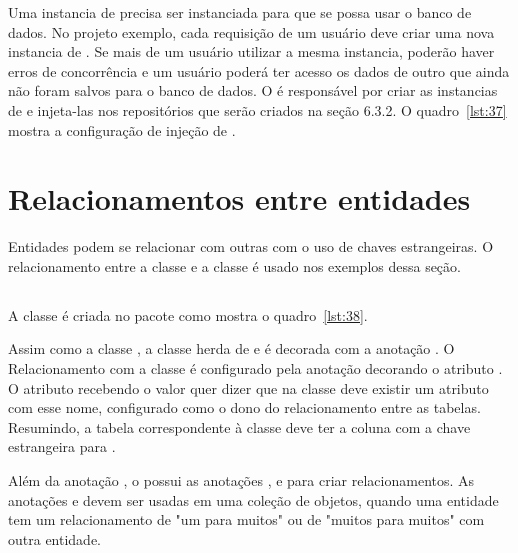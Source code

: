 Uma instancia de  precisa ser instanciada para que se possa usar o banco de dados. No projeto exemplo, cada requisição de um usuário deve criar uma nova instancia de . Se mais de um usuário utilizar a mesma instancia, poderão haver erros de concorrência e um usuário poderá ter acesso os dados de outro que ainda não foram salvos para o banco de dados. O  é responsável por criar as instancias de  e injeta-las nos repositórios que serão criados na seção 6.3.2. O quadro~\ref{lst:37} mostra a configuração de injeção de .


\section{Relacionamentos entre entidades}

Entidades podem se relacionar com outras com o uso de chaves estrangeiras. O relacionamento entre a classe  e a classe  é usado nos exemplos dessa seção.

\subsection{}

A classe  é criada no pacote  como mostra o quadro~\ref{lst:38}.


Assim como a classe , a classe  herda de  e é decorada com a anotação . O Relacionamento com a classe  é configurado pela anotação  decorando o atributo . O atributo  recebendo o valor  quer dizer que na classe  deve existir um atributo com esse nome, configurado como o dono do relacionamento entre as tabelas. Resumindo, a tabela correspondente à classe  deve ter a coluna com a chave estrangeira para .

Além da anotação , o  possui as anotações ,  e  para criar relacionamentos. As anotações  e  devem ser usadas em uma coleção de objetos, quando uma entidade tem um relacionamento de "um para muitos" ou de "muitos para muitos" com outra entidade.

